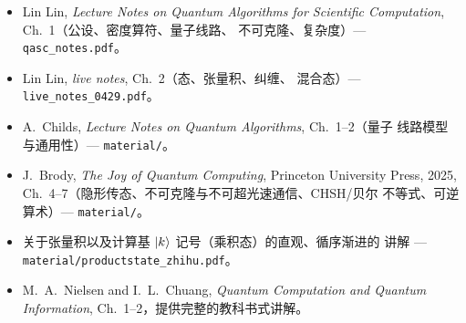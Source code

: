 \readingsection
\begin{itemize}[leftmargin=1.4em]
  \item Lin Lin, \emph{Lecture Notes on Quantum Algorithms for Scientific
        Computation}, Ch.~1（公设、密度算符、量子线路、
        不可克隆、复杂度）--- \texttt{qasc\_notes.pdf}。
  \item Lin Lin, \emph{live notes}, Ch.~2（态、张量积、纠缠、
        混合态）--- \texttt{live\_notes\_0429.pdf}。
  \item A.~Childs, \emph{Lecture Notes on Quantum Algorithms}, Ch.~1--2（量子
        线路模型与通用性）--- \texttt{material/}。
  \item J.~Brody, \emph{The Joy of Quantum Computing}, Princeton University Press,
        2025, Ch.~4--7（隐形传态、不可克隆与不可超光速通信、CHSH/贝尔
        不等式、可逆算术）--- \texttt{material/}。
  \item 关于张量积以及计算基 $\ket{k}$ 记号（乘积态）的直观、循序渐进的
        讲解 ---
        \texttt{material/productstate\_zhihu.pdf}。
  \item M.~A.~Nielsen and I.~L.~Chuang, \emph{Quantum Computation and Quantum
        Information}, Ch.~1--2，提供完整的教科书式讲解。
\end{itemize}
